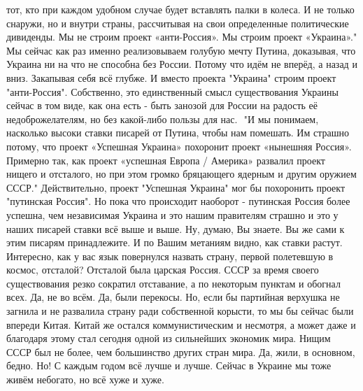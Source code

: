 \begin{itemize}
тот, кто при каждом удобном случае будет вставлять палки в колеса. И не только
снаружи, но и внутри страны, рассчитывая на свои определенные политические
дивиденды.
Мы не строим проект «анти-Россия». Мы строим проект «Украина»."
Мы сейчас как раз именно реализовываем голубую мечту Путина, доказывая, что
Украина ни на что не способна без России. Потому что идём не вперёд, а назад и
вниз. Закапывая себя всё глубже. И вместо проекта "Украина" строим проект
"анти-Россия". Собственно, это единственный смысл существования Украины сейчас
в том виде, как она есть - быть занозой для России на радость её
недоброжелателям, но без какой-либо пользы для нас.  ⁠
"И мы понимаем, насколько высоки ставки писарей от Путина, чтобы нам помешать.
Им страшно потому, что проект «Успешная Украина» похоронит проект «нынешняя
Россия». Примерно так, как проект «успешная Европа / Америка» развалил проект
нищего и отсталого, но при этом громко бряцающего ядерным и другим оружием
СССР."
Действительно, проект "Успешная Украина" мог бы похоронить проект "путинская
Россия". Но пока что происходит наоборот - путинская Россия более успешна, чем
независимая Украина и это нашим правителям страшно и это у наших писарей ставки
всё выше и выше. Ну, думаю, Вы знаете. Вы же сами к этим писарям принадлежите.
И по Вашим метаниям видно, как ставки растут. Интересно, как у вас язык
повернулся назвать страну, первой полетевшую в космос, отсталой?
\Smiley[1.0][yellow] 
Отсталой была царская Россия. СССР за время своего существования резко сократил
отставание, а по некоторым пунктам и обогнал всех. Да, не во всём. Да, были
перекосы. Но, если бы партийная верхушка не загнила и не развалила страну ради
собственной корысти, то мы бы сейчас были впереди Китая. 
Китай же остался коммунистическим и несмотря, а может даже и благодаря этому
стал сегодня одной из сильнейших экономик мира. Нищим СССР был не более, чем
большинство других стран мира. Да, жили, в основном, бедно. Но! С каждым годом
всё лучше и лучше.  Сейчас в Украине мы тоже живём небогато, но всё хуже и
хуже.


\end{itemize}
